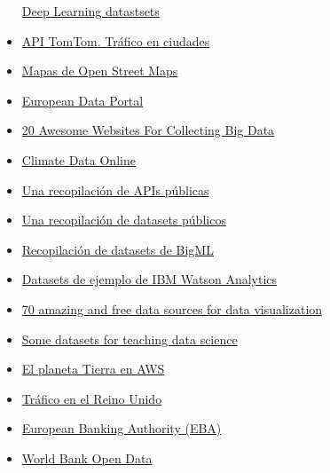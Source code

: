 \documentclass[]{article}
\begin{document}
\begin{itemize}
  \href{http://deeplearning.net/datasets/}{Deep Learning datastsets}
\item
  \href{http://developer.tomtom.com/products/onlinenavigation/onlinetraffic/onlinetrafficflow}{API
  TomTom. Tráfico en ciudades}
\item
  \href{http://download.geofabrik.de/}{Mapas de Open Street Maps}
\item
  \href{https://www.europeandataportal.eu/}{European Data Portal}
\item
  \href{https://datafloq.com/read/20-awesome-websites-for-collecting-big-data/2737?utm_source=Datafloq\%20newsletter\&utm_campaign=979b1fada5-EMAIL_CAMPAIGN_2017_03_13\&utm_medium=email\&utm_term=0_655692fdfd-979b1fada5-90449429}{20
  Awesome Websites For Collecting Big Data}
\item
  \href{https://www.ncdc.noaa.gov/cdo-web/}{Climate Data Online}
\item
  \href{https://github.com/toddmotto/public-apis}{Una recopilación de
  APIs públicas}
\item
  \href{https://github.com/caesar0301/awesome-public-datasets}{Una
  recopilación de datasets públicos}
\item
  \href{https://blog.bigml.com/list-of-public-data-sources-fit-for-machine-learning/}{Recopilación
  de datasets de BigML}
\item
  \href{https://www.ibm.com/communities/analytics/watson-analytics-blog/guide-to-sample-datasets/}{Datasets
  de ejemplo de IBM Watson Analytics}
\item
  \href{http://bigdata-madesimple.com/70-amazing-and-free-data-sources-for-data-visualization/?lipi=urn\%3Ali\%3Apage\%3Ad_flagship3_feed\%3BAJsccljrTlK\%2BpMAMcPD6Yw\%3D\%3D}{70
  amazing and free data sources for data visualization}
\item
  \href{https://simplystatistics.org/2018/01/22/the-dslabs-package-provides-datasets-for-teaching-data-science/?lipi=urn\%3Ali\%3Apage\%3Ad_flagship3_feed\%3BaLl4moGVT\%2BS65o19ly\%2F\%2FaQ\%3D\%3D}{Some
  datasets for teaching data science}
\item
  \href{https://aws.amazon.com/es/earth/}{El planeta Tierra en AWS}
\item
  \href{https://www.dft.gov.uk/traffic-counts/}{Tráfico en el Reino
  Unido}
\item
  \href{http://www.eba.europa.eu/risk-analysis-and-data;jsessionid=9D39E5DC46932D2C76C572A1D1B1B5BA}{European
  Banking Authority (EBA)}
\item
  \href{https://data.worldbank.org/}{World Bank Open Data}

\end{itemize}
\end{document}
